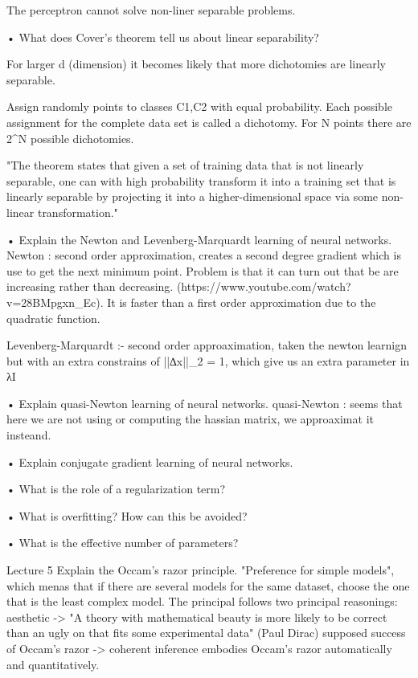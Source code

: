 The perceptron cannot solve non-liner separable problems.


• What does Cover’s theorem tell us about linear separability?

For larger d (dimension) it becomes likely that more dichotomies are linearly separable.

Assign randomly points to classes C1,C2 with equal probability. Each possible assignment for the complete data set is called a dichotomy. For N points there are 2^N possible dichotomies.


"The theorem states that given a set of training data that is not linearly separable, one can with high probability transform it into a training set that is linearly separable by projecting it into a higher-dimensional space via some non-linear transformation."


• Explain the Newton and Levenberg-Marquardt learning of neural networks.
Newton : second order approximation, creates a second degree gradient which is use to get the next minimum point. Problem is that it can turn out that be are increasing rather than decreasing. (https://www.youtube.com/watch?v=28BMpgxn_Ec). It is faster than a first order approximation due to the quadratic function.

Levenberg-Marquardt :- second order approaximation, taken the newton learnign but with an extra constrains of ||∆x||_2 = 1, which give us an extra parameter in λI


• Explain quasi-Newton learning of neural networks.
quasi-Newton : seems that here we are not using or computing the hassian matrix, we approaximat it insteand.

• Explain conjugate gradient learning of neural networks.


• What is the role of a regularization term?


• What is overfitting? How can this be avoided?


• What is the effective number of parameters?



Lecture 5
Explain the Occam’s razor principle.
"Preference for simple models", which menas that if there are several models for the same dataset, choose the one that is the least complex model.  The principal follows two principal reasonings:
aesthetic -> "A theory with mathematical beauty is more likely to be correct than an ugly on that fits some experimental data" (Paul Dirac)
supposed success of Occam's razor -> coherent inference embodies Occam's razor automatically and quantitatively.



